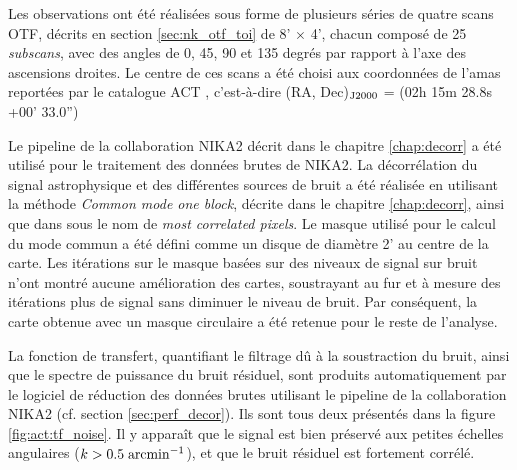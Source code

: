 Les observations ont été réalisées sous forme de plusieurs séries de quatre scans OTF, décrits en section \ref{sec:nk_otf_toi} de 8' $\times$ 4', chacun composé de 25 \textit{subscans}, avec des angles de 0, 45, 90 et 135 degrés par rapport à l'axe des ascensions droites.
Le centre de ces scans a été choisi aux coordonnées de l'amas reportées par le catalogue ACT \cite{menanteau_atacama_2013}, c'est-à-dire (RA, Dec)$_{\rm J2000}$ = (02h 15m 28.8s +00' 33.0'')

Le pipeline de la collaboration NIKA2 décrit dans le chapitre \ref{chap:decorr} a été utilisé pour le traitement des données brutes de NIKA2.
La décorrélation du signal astrophysique et des différentes sources de bruit a été réalisée en utilisant la méthode \textit{Common mode one block}, décrite dans le chapitre \ref{chap:decorr}, ainsi que dans  sous le nom de \textit{most correlated pixels}.
Le masque utilisé pour le calcul du mode commun a été défini comme un disque de diamètre 2'  au centre de la carte.
Les itérations sur le masque basées sur des niveaux de signal sur bruit n'ont montré aucune amélioration des cartes, soustrayant au fur et à mesure des itérations plus de signal sans diminuer le niveau de bruit.
Par conséquent, la carte obtenue avec un masque circulaire a été retenue pour le reste de l'analyse.

La fonction de transfert, quantifiant le filtrage dû à la soustraction du bruit, ainsi que le spectre de puissance du bruit résiduel, sont produits automatiquement par le logiciel de réduction des données brutes utilisant le pipeline de la collaboration NIKA2 (cf. section \ref{sec:perf_decor}).
Ils sont tous deux présentés dans la figure \ref{fig:act:tf_noise}.
Il y apparaît que le signal est bien préservé aux petites échelles angulaires ($k > 0.5 \; {\rm arcmin}^{-1}$), et que le bruit résiduel est fortement corrélé.

